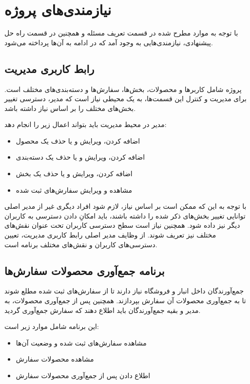 \section{نیازمندی‌های پروژه}
با توجه به موارد مطرح شده در قسمت تعریف مسئله و همچنین در قسمت راه حل پیشنهادی، نیازمندی‌هایی به وجود آمد که در ادامه به آن‌ها پرداخته می‌شود.

\subsection{رابط کاربری مدیریت}
پروژه شامل کاربرها و محصولات، بخش‌ها، سفارش‌ها و دسته‌بندی‌های مختلف است. برای مدیریت و کنترل این قسمت‌ها، به یک محیطی نیاز است که مدیر، دسترسی تغییر بخش‌های مختلف را بر اساس نیاز داشته باشد.

مدیر در محیط مدیریت باید بتواند اعمال زیر را انجام دهد:
\begin{itemize}
   	\item اضافه کردن، ویرایش و یا حذف یک محصول
   	\item اضافه کردن، ویرایش و یا حذف یک دسته‌بندی
   	\item اضافه کردن، ویرایش و یا حذف یک بخش
   	\item مشاهده و ویرایش سفارش‌های ثبت شده
\end{itemize}
با توجه به این که ممکن است بر اساس نیاز، لازم شود افراد دیگری غیر از مدیر اصلی توانایی تغییر بخش‌های ذکر شده را داشته باشند، باید امکانِ دادن دسترسی به کاربران دیگر نیز داده شود. همچنین نیاز است سطح دسترسی کاربران تحت عنوان نقش‌های مختلف نیز تعریف شوند. از وظایف مدیر اصلی رابط کاربری مدیریت، تعیین دسترسی‌های کاربران و نقش‌های مختلف برنامه است.

\subsection{برنامه جمع‌آوری محصولات سفارش‌ها}
جمع‌آورندگان داخل انبار و فروشگاه نیاز دارند تا از سفارش‌های ثبت شده مطلع شوند تا به جمع‌آوری محصولات آن سفارش بپردازند. همچنین پس از جمع‌آوری محصولات، به مدیر و بقیه جمع‌آورندگان باید اطلاع دهند که سفارش جمع‌آوری گردید.

این برنامه شامل موارد زیر است:
\begin{itemize}
	\item مشاهده سفارش‌های ثبت شده و وضعیت آن‌ها
	\item مشاهده محصولات سفارش
	\item اطلاع‌ دادن پس از جمع‌آوری محصولات سفارش
\end{itemize}

